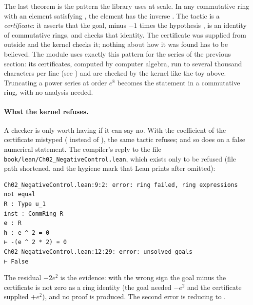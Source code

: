 The last theorem is the pattern the library uses at scale. In any commutative ring  with an element  satisfying , the element
 has the inverse . The tactic  is a \emph{certificate}: it asserts that the goal, minus $-1$ times the
hypothesis , is an identity of commutative rings, and  checks that identity. The certificate was supplied from outside and the kernel checks it;
nothing about how it was found has to be believed. The module  uses exactly this pattern for the series of the previous
section: its certificates, computed by computer algebra, run to several thousand characters per line (see ) and are checked by the
kernel like the toy above. Truncating a power series at order $e^8$ becomes the statement  in a commutative ring, with no analysis needed.

\paragraph{What the kernel refuses.} A checker is only worth having if it can say no. With the coefficient of the certificate mistyped ( instead of ),
the same tactic refuses; and so does  on a false numerical statement. The compiler's reply to the file \texttt{book/lean/Ch02\_NegativeControl.lean}, which exists only to be refused
(file path shortened, and the hygiene mark that Lean prints after  omitted):
\begin{lstlisting}[style=plainmono]
Ch02_NegativeControl.lean:9:2: error: ring failed, ring expressions not equal
R : Type u_1
inst : CommRing R
e : R
h : e ^ 2 = 0
⊢ -(e ^ 2 * 2) = 0
Ch02_NegativeControl.lean:12:29: error: unsolved goals
⊢ False
\end{lstlisting}
The residual $-2e^2$ is the evidence: with the wrong sign the goal minus the certificate is not zero as a ring identity (the goal needed $-e^2$ and the certificate supplied $+e^2$), and no proof
is produced. The second error is  reducing  to .

